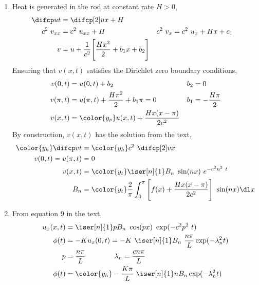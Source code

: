 \begin{enumerate}
    \item Heat is generated in the rod at constant rate $ H > 0 $,
          \begin{align}
              \difcp ut   & = \difcp[2] ux + H                                \\
              c^2\ v_{xx} & = c^2\ u_{xx} + H                               &
              c^2\ v_{x}  & = c^2\ u_{x} + Hx + c_1                           \\
              v           & = u + \frac{1}{c^2} \Bigg[\frac{Hx^2}{2} + b_1x
                  + b_2\Bigg]
          \end{align}
          Ensuring that $ v(x, t) $ satisfies the Dirichlet zero boundary conditions,
          \begin{align}
              v(0, t)       & = u(0, t) + b_2                                 &
              b_2           & = 0                                               \\
              v(\pi, t)     & = u(\pi, t) + \frac{H\pi^2}{2}
              + b_1 \pi = 0 &
              b_1           & = -\frac{H\pi}{2}                                 \\
              v(x, t)       & = \color{y_p}u(x, t) + \frac{Hx(x - \pi)}{2c^2}
          \end{align}
          By construction, $ v(x, t) $ has the solution from the text,
          \begin{align}
              \color{y_h}\difcp vt & = \color{y_h}c^2\ \difcp[2] vx                   \\
              v(0, t) = v(\pi, t)  & = 0                                              \\
              v(x, t)              & = \color{y_t}\iser[n]{1} B_n\ \sin(nx)
              \ e^{-c^2n^2\ t}                                                        \\
              B_n                  & = \color{y_t}\frac{2}{\pi} \int_{0}^{\pi} \Bigg[
                  f(x) + \frac{Hx(x-\pi)}{2c^2}\Bigg]\ \sin(nx) \dl x
          \end{align}

    \item From equation $ 9 $ in the text,
          \begin{align}
              u_x(x, t) & = \iser[n]{1} pB_n\ \cos(px)
              \ \exp(-c^2p^2\ t)                                                    \\
              \phi(t)   & = -Ku_x(0, t) = -K\ \iser[n]{1} B_n\ \frac{n\pi}{L}
              \exp(-\lambda_n^2 t)                                                  \\
              p         & = \frac{n\pi}{L} \qquad\qquad \lambda_n = \frac{cn\pi}{L} \\
              \phi(t)   & = \color{y_h} -\frac{K\pi}{L}\ \iser[n]{1} nB_n
              \exp(-\lambda_n^2 t)
          \end{align}


\end{enumerate}
